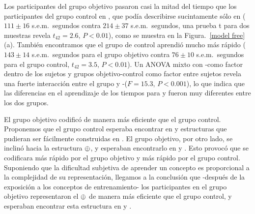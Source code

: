 Los participantes del grupo objetivo pasaron casi la mitad del tiempo que los participantes del grupo control en \testa, que podía describirse sucintamente sólo en \gramboolxor ($111\pm16$ s.e.m.\ segundos contra $214\pm37$ s.e.m.\ segundos, una prueba t para dos muestras revela $t_{42}=2.6$, $P<0.01$), como se muestra en la Figura.~\ref{model free} (a). También encontramos que el grupo de control aprendió mucho más rápido \testb ($143\pm14$ s.e.m.\ segundos para el grupo objetivo contra $76\pm10$ s.e.m.\ segundos para el grupo control, $t_{42}=3.5$, $P<0.01$). Un ANOVA mixto con \testa-\testb como factor dentro de los sujetos y grupos objetivo-control como factor entre sujetos revela una fuerte interacción entre el grupo y \testa-\testb ($F=15.3$, $P<0.001$), lo que indica que las diferencias en el aprendizaje de los tiempos para \testa y \testb fueron muy diferentes entre los dos grupos.


El grupo objetivo codificó \testa de manera más eficiente que el grupo control. Proponemos que el grupo control esperaba encontrar en \testa y \testb estructuras que pudieran ser fácilmente construidas en \grambool. El grupo objetivo, por otro lado, se inclinó hacia la estructura $\oplus$, y esperaban encontrarlo en \testa y \testb. Esto provocó que \testa se codificara más rápido por el grupo objetivo y \testb más rápido por el grupo control. Suponiendo que la dificultad subjetiva de aprender un concepto es proporcional a la complejidad de su representación, llegamos a la conclusión que -después de la exposición a los conceptos de entrenamiento- los participantes en el grupo objetivo representaron el $\oplus$ de manera más eficiente que el grupo control, y esperaban encontrar esta estructura en \testa y \testb.



